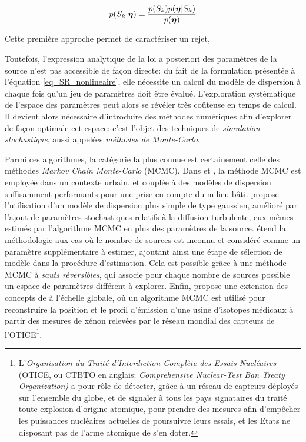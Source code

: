  \begin{equation}
 \label{eq_bayes_monte_carlo}
 p(S_k|{\bm{\eta}}) = \dfrac{p(S_k)p({\bm{\eta}} | S_k)}{p({\bm{\eta}})}
 \end{equation}
 
 Cette première approche permet de caractériser un rejet, 
 
 Toutefois, l'expression analytique de la  loi a posteriori des paramètres de la source n'est  pas accessible de façon directe: du fait de la formulation présentée à l'équation \eqref{eq_SR_nonlineaire}, elle nécessite un calcul du modèle de dispersion à chaque fois qu'un jeu de paramètres doit être évalué. L'exploration systématique de l'espace des paramètres peut alors se révéler très coûteuse en temps de calcul. Il devient alors nécessaire d'introduire des méthodes numériques afin d'explorer de façon optimale cet espace: c'est l'objet des techniques de \textit{simulation stochastique}, aussi appelées \textit{méthodes de Monte-Carlo}.

 Parmi ces algorithmes, la catégorie la plus connue est certainement celle des méthodes  \textit{Markov Chain Monte-Carlo} (MCMC). Dans \cite{Keats2007} et \cite{Chow2008}, la méthode MCMC est employée dans un contexte urbain, et couplée à des modèles de dispersion suffisamment performants pour une prise en compte du milieu bâti. \cite{Senocak2008} propose l'utilisation d'un modèle de dispersion plus simple de type gaussien, amélioré par l'ajout de paramètres stochastiques relatifs à la diffusion turbulente, eux-mêmes estimés par l'algorithme MCMC en plus des paramètres de la source. \cite{Yee2008b} étend la méthodologie aux cas où le nombre de sources est inconnu et considéré comme un paramètre supplémentaire à estimer, ajoutant ainsi une étape de sélection de modèle dans la procédure d'estimation. Cela est possible grâce à une méthode MCMC à \textit{sauts réversibles}, qui associe pour chaque nombre de sources possible un espace de paramètres différent à explorer. Enfin, \cite{Yee2014} propose une extension des concepts de \cite{Keats2007} à l'échelle globale, où un algorithme MCMC est utilisé pour reconstruire la position et le profil d'émission d'une usine d'isotopes médicaux à partir des mesures de xénon relevées par le réseau mondial des capteurs de l'OTICE\footnote{L'\textit{Organisation du Traité d'Interdiction Complète des Essais Nucléaires} (OTICE, ou CTBTO en anglais: \textit{Comprehensive Nuclear-Test Ban Treaty Organization)} a pour rôle de détecter, grâce à un réseau de capteurs déployés sur l'ensemble du globe, et de signaler à tous les pays signataires du traité toute explosion d'origine atomique, pour prendre des mesures afin d'empêcher les puissances nucléaires actuelles de poursuivre leurs essais, et les Etats ne disposant pas de l'arme atomique de s'en doter.}. \\